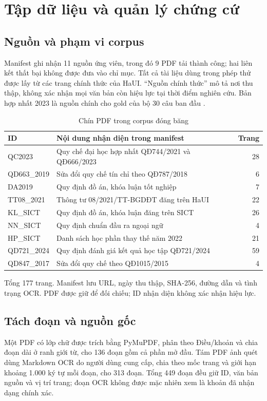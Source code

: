 \section{Tập dữ liệu và quản lý chứng cứ}
\subsection{Nguồn và phạm vi corpus}
Manifest ghi nhận 11 nguồn ứng viên, trong đó 9 PDF tải thành công; hai liên kết thất bại không được đưa vào chỉ mục. Tất cả tài liệu dùng trong phép thử được lấy từ các trang chính thức của HaUI. ``Nguồn chính thức'' mô tả nơi thu thập, không xác nhận mọi văn bản còn hiệu lực tại thời điểm nghiên cứu. Bản hợp nhất 2023 là nguồn chính cho gold của bộ 30 câu ban đầu \cite{qc2023}.

\begin{table}[H]
\centering\small
\caption{Chín PDF trong corpus đóng băng}
\begin{tabularx}{\textwidth}{l X r}
\toprule ID & Nội dung nhận diện trong manifest & Trang\\
\midrule
QC2023 & Quy chế đại học hợp nhất QĐ744/2021 và QĐ666/2023 & 28\\
QD663\_2019 & Sửa đổi quy chế tín chỉ theo QĐ787/2018 & 6\\
DA2019 & Quy định đồ án, khóa luận tốt nghiệp & 7\\
TT08\_2021 & Thông tư 08/2021/TT-BGDĐT đăng trên HaUI & 22\\
KL\_SICT & Quy định đồ án, khóa luận đăng trên SICT & 26\\
NN\_SICT & Quy định chuẩn đầu ra ngoại ngữ & 4\\
HP\_SICT & Danh sách học phần thay thế năm 2022 & 21\\
QD721\_2024 & Quy định đánh giá kết quả học tập QĐ721/2024 & 59\\
QD847\_2017 & Sửa đổi quy chế theo QĐ1015/2015 & 4\\
\bottomrule
\end{tabularx}
\end{table}

Tổng 177 trang. Manifest lưu URL, ngày thu thập, SHA-256, đường dẫn và tình trạng OCR. PDF được giữ để đối chiếu; ID nhận diện không xác nhận hiệu lực.

\subsection{Tách đoạn và nguồn gốc}
Một PDF có lớp chữ được trích bằng PyMuPDF, phân theo Điều/khoản và chia đoạn dài ở ranh giới từ, cho 136 đoạn gồm cả phần mở đầu. Tám PDF ảnh quét dùng Markdown OCR do người dùng cung cấp, chia theo mốc trang và giới hạn khoảng 1.000 ký tự mỗi đoạn, cho 313 đoạn. Tổng 449 đoạn đều giữ ID, văn bản nguồn và vị trí trang; đoạn OCR không được mặc nhiên xem là khoản đã nhận dạng chính xác.

